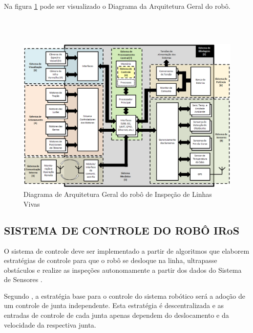 \documentclass[12pt,oneside,a4paper, chapter=TITLE, section = TITLE, english, brazil]{abntex2}
\begin{document}
Na figura \ref{fig:diagrama} pode ser visualizado o Diagrama da Arquitetura Geral do robô.

\ \\ \ \\

\begin{figure}[h] %
\centering
\includegraphics[scale=0.45]{./imagens/Diagrama_Completo}
\caption[Diagrama de Arquitetura Geral do robô de Inspeção de Linhas Vivas]{Diagrama de Arquitetura Geral do robô de Inspeção de Linhas Vivas \cite{cemig}}
\label{fig:diagrama}
\end{figure}

\subsection{SISTEMA DE CONTROLE DO ROBÔ IRoS}

O sistema de controle deve ser implementado a partir de algoritmos que elaborem estratégias de controle para que o robô se desloque na linha, ultrapasse obstáculos e realize as inspeções autonomamente a partir dos dados do Sistema de Sensores \cite{cemig}.

Segundo , a estratégia base para o controle do sistema robótico será a adoção de um controle de junta independente. Esta estratégia é descentralizada e as entradas de controle de cada junta apenas dependem do deslocamento e da velocidade da respectiva junta.
\end{document}
